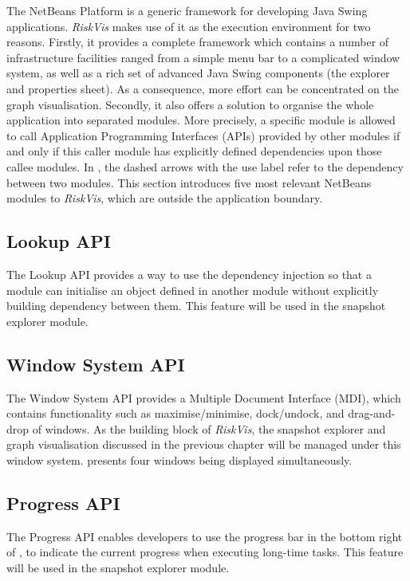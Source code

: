 The NetBeans Platform is a generic framework for developing Java Swing applications. \emph{RiskVis} makes use of it as the execution environment for two reasons. Firstly, it provides a complete framework which contains a number of infrastructure facilities ranged from a simple menu bar to a complicated window system, as well as a rich set of advanced Java Swing components (the explorer and properties sheet). As a consequence, more effort can be concentrated on the graph visualisation. Secondly, it also offers a solution to organise the whole application into separated modules. More precisely, a specific module is allowed to call Application Programming Interfaces (APIs) provided by other modules if and only if this caller module has explicitly defined dependencies upon those callee modules. In , the dashed arrows with the use label refer to the dependency between two modules. This section introduces five most relevant NetBeans modules to \emph{RiskVis}, which are outside the application boundary.

\subsection{Lookup API}

The Lookup API provides a way to use the dependency injection so that a module can initialise an object defined in another module without explicitly building dependency between them. This feature will be used in the snapshot explorer module.

\subsection{Window System API}

The Window System API provides a Multiple Document Interface (MDI), which contains functionality such as maximise/minimise, dock/undock, and drag-and-drop of windows. As the building block of \emph{RiskVis}, the snapshot explorer and graph visualisation discussed in the previous chapter will be managed under this window system.  presents four windows being displayed simultaneously.

\subsection{Progress API}

The Progress API enables developers to use the progress bar in the bottom right of , to indicate the current progress when executing long-time tasks. This feature will be used in the snapshot explorer module.

